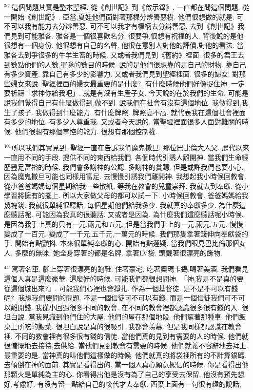 \documentclass{book}
\begin{document}
$^{361}$這個問題其實是整本聖經.
從《創世記》到《啟示錄》.
一直都在問這個問題.
從一開始《創世記》.
亞當,夏娃他們面對著那棵分辨善惡樹.
他們很想做的就是.
可不可以我有能力去分辨善惡.
可不可以我才有權柄去分辨善惡.
去到《創世記》我們見到可能雅各.
雅各是一個很喜歡名分.
很要爭,很想有祝福的人.
背後說的是他很想有一個身份.
他很想有自己的名聲.
他很在意別人對他的評價,對他的看法.
當雅各去到爭很多的牛羊生畜的時候.
又或者我們見到《舊約》裡面.
很多的君王去到數點他們的人數,軍隊的數目的時候.
說的是他們很想靠的是自己的財物.
靠自己有多少資產.
靠自己有多少的影響力.
又或者我們見到聖經裡面.
很多的婦女.
對那些婦女來說.
聖經裡面的婦女最重要的是什麼?.
有什麼時候他們好像捉住神.
一定要祈禱「求神你給我吧」.
就是有沒有生產子女.
今天說的在於我們的生命.
可能是說我們覺得自己有什麼做得到,做不到.
說我們在社會有沒有這個地位.
我做得到,我生了孩子.
我做得到什麼能力.
有什麼牌照.
牌照高不高.
就代表我在這個社會裡面有多少的地位.
有多少人尊重我.
又或者今天說的.
當聖經裡面很多人面對難關的時候.
他們很想有那個掌控的能力.
很想有那個控制權.

$^{401}$所以我們其實見到.
聖經一直在告訴我們魔鬼撒旦.
那位巴比倫大人父.
歷代以來一直用不同的手段.
提供不同的東西給我們.
各個時代引誘人離開神.
當我們生命經歷豐足富裕的時候.
我們會多謝神的公認.
多謝神的賞賜.
但是或許我們也要小心.
因為魔鬼撒旦可能也同樣用富足.
去慢慢引誘我們離開神.
我想起我小時候回教會.
從小爸爸媽媽每個星期給我一些散紙.
等我在教會的兒童崇拜.
我就去到奉獻.
從小學習將擁有的擺上.
所以大家做父母的都可以試一下.
小時候回教會.
爸爸媽媽給我幾塊錢.
我就很單純很聽話.
每個星期他們給我多少.
我就真的奉獻多少.
為什麼這麼聽話呢.
可能因為我真的很聽話.
又或者是因為.
為什麼我們這麼聽話呢小時候.
是因為我手上真的只有一元,兩元和五元.
但是當我們手上的一元,兩元,五元.
慢慢變成了一百元.
變成了一千元,五千元,一萬元的時候.
我們那隻拿著錢伸向奉獻袋的手.
開始有點顫抖.
本來很單純奉獻的心.
開始有點遲疑.
當我們眼見巴比倫那個女人.
多麼的無味.
她全身穿著的都是名牌.
拿著LV袋.
頭戴著很漂亮的飾物.

$^{441}$駕著名車.
腳上穿著很漂亮的跑鞋.
住著豪宅.
吃著奧瑪卡錫,喝著美酒.
我們看見這個人真是這麼豪華.
這麼好的時候.
可能我們都很想問神.
「神,我是不是真的要從這個城出來?」.
可能我們心裡也會掙扎.
作為一個基督徒.
是不是不可以有錢呢?.
我想我們要問的問題.
不是一個信徒可不可以有錢.
而是一個信徒我們可不可以離開錢.
我從小回過很多不同的教會.
在不同的教會裡都認識很多很有錢的人.
很坦白說.
當我見識到他們住的大屋.
他們的屋在那個地段.
他們駕著那種車.
他們飯桌上所吃的飯菜.
很坦白說是真的很吸引.
我都會羨慕.
但是我同樣都認識在教會裡.
不同的教會裡有很多很有錢的信徒.
當他們真的見到有需要的人的時候.
他們就很慷慨地去接待,去供給.
當他們見到教會有需要的時候.
他們就義不容辭地去拜上.
最重要的是.
當神真的叫他們這樣做的時候.
他們就真的將袋裡所有的不計算銀碼.
去傾倒在神的面前.
其實是看得出的.
當一個人真心願意擺信的時候.
你是看得出他那顆火是單純為主的心.
你看得出他是沒有為了自己的享受去保留.
他沒有預先想好,考慮好.
有沒有留一點給自己的後代才去奉獻.
西葉上面有一句很有趣的說話.
\end{document}
